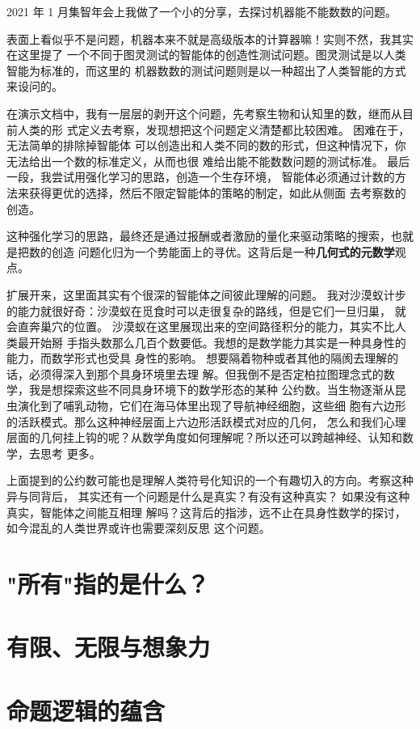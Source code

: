 \documentclass[a4paper,12pt]{article}
\numberwithin{problem}{section}
\numberwithin{definition}{section}
\numberwithin{lemma}{section}
\numberwithin{proposition}{section}
\numberwithin{theorem}{section}
\numberwithin{grammar}{section}
\numberwithin{program}{section}
\numberwithin{convention}{section}
\numberwithin{corollary}{section}
\begin{document}
2021 年 1 月集智年会上我做了一个小的分享，去探讨机器能不能数数的问题。

表面上看似乎不是问题，机器本来不就是高级版本的计算器嘛！实则不然，我其实在这里提了
一个不同于图灵测试的智能体的创造性测试问题。图灵测试是以人类智能为标准的，而这里的
机器数数的测试问题则是以一种超出了人类智能的方式来设问的。

在演示文档中，我有一层层的剥开这个问题，先考察生物和认知里的数，继而从目前人类的形
式定义去考察，发现想把这个问题定义清楚都比较困难。 困难在于，无法简单的排除掉智能体
可以创造出和人类不同的数的形式，但这种情况下，你无法给出一个数的标准定义，从而也很
难给出能不能数数问题的测试标准。 最后一段，我尝试用强化学习的思路，创造一个生存环境，
智能体必须通过计数的方法来获得更优的选择，然后不限定智能体的策略的制定，如此从侧面
去考察数的创造。

这种强化学习的思路，最终还是通过报酬或者激励的量化来驱动策略的搜索，也就是把数的创造
问题化归为一个势能面上的寻优。这背后是一种\textbf{几何式的元数学}观点。

扩展开来，这里面其实有个很深的智能体之间彼此理解的问题。
我对沙漠蚁计步的能力就很好奇：沙漠蚁在觅食时可以走很复杂的路线，但是它们一旦归巢，
就会直奔巢穴的位置。 沙漠蚁在这里展现出来的空间路径积分的能力，其实不比人类最开始掰
手指头数那么几百个数要低。我想的是数学能力其实是一种具身性的能力，而数学形式也受具
身性的影响。 想要隔着物种或者其他的隔阂去理解的话，必须得深入到那个具身环境里去理
解。但我倒不是否定柏拉图理念式的数学，我是想探索这些不同具身环境下的数学形态的某种
公约数。当生物逐渐从昆虫演化到了哺乳动物，它们在海马体里出现了导航神经细胞，这些细
胞有六边形的活跃模式。那么这种神经层面上六边形活跃模式对应的几何， 怎么和我们心理
层面的几何挂上钩的呢？从数学角度如何理解呢？所以还可以跨越神经、认知和数学，去思考
更多。

上面提到的公约数可能也是理解人类符号化知识的一个有趣切入的方向。考察这种异与同背后，
其实还有一个问题是什么是真实？有没有这种真实？ 如果没有这种真实，智能体之间能互相理
解吗？这背后的指涉，远不止在具身性数学的探讨，如今混乱的人类世界或许也需要深刻反思
这个问题。

\section{"所有"指的是什么？}

\section{有限、无限与想象力}

\section{命题逻辑的蕴含}
\end{document}
